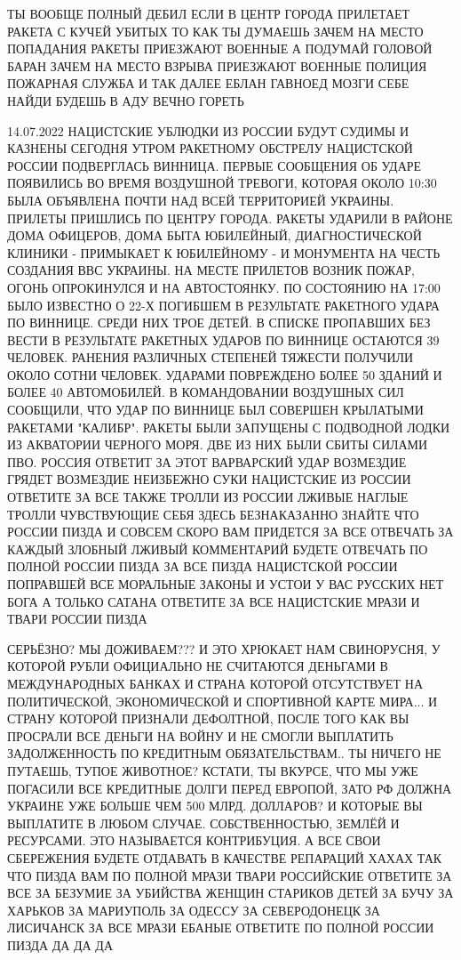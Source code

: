 ТЫ ВООБЩЕ ПОЛНЫЙ ДЕБИЛ ЕСЛИ В ЦЕНТР ГОРОДА ПРИЛЕТАЕТ РАКЕТА С КУЧЕЙ УБИТЫХ ТО
КАК ТЫ ДУМАЕШЬ ЗАЧЕМ НА МЕСТО ПОПАДАНИЯ РАКЕТЫ ПРИЕЗЖАЮТ ВОЕННЫЕ А ПОДУМАЙ
ГОЛОВОЙ БАРАН ЗАЧЕМ НА МЕСТО ВЗРЫВА ПРИЕЗЖАЮТ ВОЕННЫЕ ПОЛИЦИЯ ПОЖАРНАЯ СЛУЖБА И
ТАК ДАЛЕЕ ЕБЛАН ГАВНОЕД МОЗГИ СЕБЕ НАЙДИ БУДЕШЬ В АДУ ВЕЧНО ГОРЕТЬ

14.07.2022
НАЦИСТСКИЕ УБЛЮДКИ ИЗ РОССИИ БУДУТ СУДИМЫ И КАЗНЕНЫ СЕГОДНЯ УТРОМ РАКЕТНОМУ
ОБСТРЕЛУ НАЦИСТСКОЙ РОССИИ ПОДВЕРГЛАСЬ ВИННИЦА. ПЕРВЫЕ СООБЩЕНИЯ ОБ УДАРЕ
ПОЯВИЛИСЬ ВО ВРЕМЯ ВОЗДУШНОЙ ТРЕВОГИ, КОТОРАЯ ОКОЛО 10:30 БЫЛА ОБЪЯВЛЕНА ПОЧТИ
НАД ВСЕЙ ТЕРРИТОРИЕЙ УКРАИНЫ. ПРИЛЕТЫ ПРИШЛИСЬ ПО ЦЕНТРУ ГОРОДА. РАКЕТЫ УДАРИЛИ
В РАЙОНЕ ДОМА ОФИЦЕРОВ, ДОМА БЫТА ЮБИЛЕЙНЫЙ, ДИАГНОСТИЧЕСКОЙ КЛИНИКИ
- ПРИМЫКАЕТ К ЮБИЛЕЙНОМУ - И МОНУМЕНТА НА ЧЕСТЬ СОЗДАНИЯ ВВС УКРАИНЫ.  НА МЕСТЕ
ПРИЛЕТОВ ВОЗНИК ПОЖАР, ОГОНЬ ОПРОКИНУЛСЯ И НА АВТОСТОЯНКУ. ПО СОСТОЯНИЮ НА
17:00 БЫЛО ИЗВЕСТНО О 22-Х ПОГИБШЕМ В РЕЗУЛЬТАТЕ РАКЕТНОГО УДАРА ПО ВИННИЦЕ.
СРЕДИ НИХ ТРОЕ ДЕТЕЙ. В СПИСКЕ ПРОПАВШИХ БЕЗ ВЕСТИ В РЕЗУЛЬТАТЕ РАКЕТНЫХ УДАРОВ
ПО ВИННИЦЕ ОСТАЮТСЯ 39 ЧЕЛОВЕК. РАНЕНИЯ РАЗЛИЧНЫХ СТЕПЕНЕЙ ТЯЖЕСТИ ПОЛУЧИЛИ
ОКОЛО СОТНИ ЧЕЛОВЕК. УДАРАМИ ПОВРЕЖДЕНО БОЛЕЕ 50 ЗДАНИЙ И БОЛЕЕ 40 АВТОМОБИЛЕЙ.
В КОМАНДОВАНИИ ВОЗДУШНЫХ СИЛ СООБЩИЛИ, ЧТО УДАР ПО ВИННИЦЕ БЫЛ СОВЕРШЕН
КРЫЛАТЫМИ РАКЕТАМИ "КАЛИБР". РАКЕТЫ БЫЛИ ЗАПУЩЕНЫ С ПОДВОДНОЙ ЛОДКИ ИЗ
АКВАТОРИИ ЧЕРНОГО МОРЯ. ДВЕ ИЗ НИХ БЫЛИ СБИТЫ СИЛАМИ ПВО.  РОССИЯ ОТВЕТИТ ЗА
ЭТОТ ВАРВАРСКИЙ УДАР ВОЗМЕЗДИЕ ГРЯДЕТ ВОЗМЕЗДИЕ НЕИЗБЕЖНО СУКИ НАЦИСТСКИЕ ИЗ
РОССИИ ОТВЕТИТЕ ЗА ВСЕ ТАКЖЕ ТРОЛЛИ ИЗ РОССИИ ЛЖИВЫЕ НАГЛЫЕ ТРОЛЛИ ЧУВСТВУЮЩИЕ
СЕБЯ ЗДЕСЬ БЕЗНАКАЗАННО ЗНАЙТЕ ЧТО РОССИИ ПИЗДА И СОВСЕМ СКОРО ВАМ ПРИДЕТСЯ ЗА
ВСЕ ОТВЕЧАТЬ ЗА КАЖДЫЙ ЗЛОБНЫЙ ЛЖИВЫЙ КОММЕНТАРИЙ БУДЕТЕ ОТВЕЧАТЬ ПО ПОЛНОЙ
РОССИИ ПИЗДА ЗА ВСЕ ПИЗДА НАЦИСТСКОЙ РОССИИ ПОПРАВШЕЙ ВСЕ МОРАЛЬНЫЕ ЗАКОНЫ И
УСТОИ У ВАС РУССКИХ НЕТ БОГА А ТОЛЬКО САТАНА ОТВЕТИТЕ ЗА ВСЕ НАЦИСТСКИЕ МРАЗИ И
ТВАРИ РОССИИ ПИЗДА

СЕРЬЁЗНО? МЫ ДОЖИВАЕМ??? И ЭТО ХРЮКАЕТ НАМ СВИНОРУСНЯ, У КОТОРОЙ РУБЛИ
ОФИЦИАЛЬНО НЕ СЧИТАЮТСЯ ДЕНЬГАМИ В МЕЖДУНАРОДНЫХ БАНКАХ И СТРАНА КОТОРОЙ
ОТСУТСТВУЕТ НА ПОЛИТИЧЕСКОЙ, ЭКОНОМИЧЕСКОЙ И СПОРТИВНОЙ КАРТЕ МИРА... И СТРАНУ
КОТОРОЙ ПРИЗНАЛИ ДЕФОЛТНОЙ, ПОСЛЕ ТОГО КАК ВЫ ПРОСРАЛИ ВСЕ ДЕНЬГИ НА ВОЙНУ И НЕ
СМОГЛИ ВЫПЛАТИТЬ ЗАДОЛЖЕННОСТЬ ПО КРЕДИТНЫМ ОБЯЗАТЕЛЬСТВАМ.. ТЫ НИЧЕГО НЕ
ПУТАЕШЬ, ТУПОЕ ЖИВОТНОЕ? КСТАТИ, ТЫ ВКУРСЕ, ЧТО МЫ УЖЕ ПОГАСИЛИ ВСЕ КРЕДИТНЫЕ
ДОЛГИ ПЕРЕД ЕВРОПОЙ, ЗАТО РФ ДОЛЖНА УКРАИНЕ УЖЕ БОЛЬШЕ ЧЕМ 500 МЛРД. ДОЛЛАРОВ?
И КОТОРЫЕ ВЫ ВЫПЛАТИТЕ В ЛЮБОМ СЛУЧАЕ. СОБСТВЕННОСТЬЮ, ЗЕМЛЁЙ И РЕСУРСАМИ. ЭТО
НАЗЫВАЕТСЯ КОНТРИБУЦИЯ. А ВСЕ СВОИ СБЕРЕЖЕНИЯ БУДЕТЕ ОТДАВАТЬ В КАЧЕСТВЕ
РЕПАРАЦИЙ ХАХАХ ТАК ЧТО ПИЗДА ВАМ ПО ПОЛНОЙ МРАЗИ ТВАРИ РОССИЙСКИЕ ОТВЕТИТЕ ЗА ВСЕ
ЗА БЕЗУМИЕ ЗА УБИЙСТВА ЖЕНЩИН СТАРИКОВ ДЕТЕЙ ЗА БУЧУ ЗА ХАРЬКОВ ЗА МАРИУПОЛЬ
ЗА ОДЕССУ ЗА СЕВЕРОДОНЕЦК ЗА ЛИСИЧАНСК ЗА ВСЕ МРАЗИ ЕБАНЫЕ ОТВЕТИТЕ ПО ПОЛНОЙ
РОССИИ ПИЗДА ДА ДА ДА
